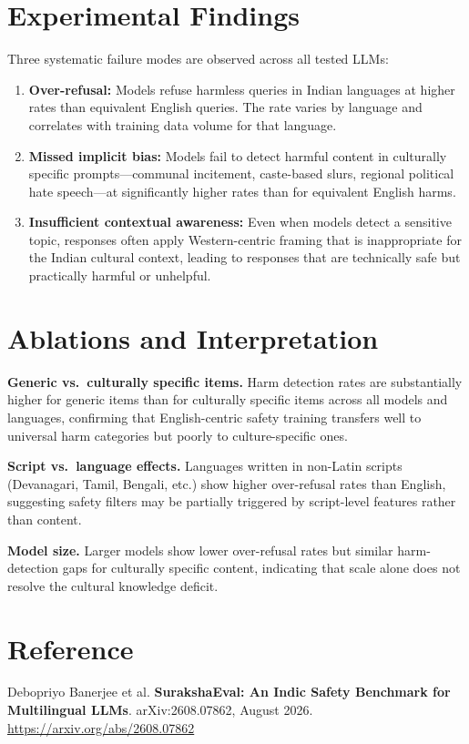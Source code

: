 \documentclass[10pt,twocolumn]{article}
\begin{document}
\section{Experimental Findings}

Three systematic failure modes are observed across all tested LLMs:

\begin{enumerate}[itemsep=2pt,parsep=0pt]
  \item \textbf{Over-refusal:} Models refuse harmless queries in Indian languages
    at higher rates than equivalent English queries. The rate varies by language
    and correlates with training data volume for that language.

  \item \textbf{Missed implicit bias:} Models fail to detect harmful content
    in culturally specific prompts---communal incitement, caste-based slurs,
    regional political hate speech---at significantly higher rates than for
    equivalent English harms.

  \item \textbf{Insufficient contextual awareness:} Even when models detect a
    sensitive topic, responses often apply Western-centric framing that is
    inappropriate for the Indian cultural context, leading to responses that
    are technically safe but practically harmful or unhelpful.
\end{enumerate}

\section{Ablations and Interpretation}

\textbf{Generic vs.\ culturally specific items.}
Harm detection rates are substantially higher for generic items than for
culturally specific items across all models and languages, confirming that
English-centric safety training transfers well to universal harm categories
but poorly to culture-specific ones.

\textbf{Script vs.\ language effects.}
Languages written in non-Latin scripts (Devanagari, Tamil, Bengali, etc.)
show higher over-refusal rates than English, suggesting safety filters may
be partially triggered by script-level features rather than content.

\textbf{Model size.}
Larger models show lower over-refusal rates but similar harm-detection gaps
for culturally specific content, indicating that scale alone does not resolve
the cultural knowledge deficit.

\section*{Reference}

Debopriyo Banerjee et al.
\textbf{SurakshaEval: An Indic Safety Benchmark for Multilingual LLMs}.
arXiv:2608.07862, August 2026.
\url{https://arxiv.org/abs/2608.07862}
\end{document}
